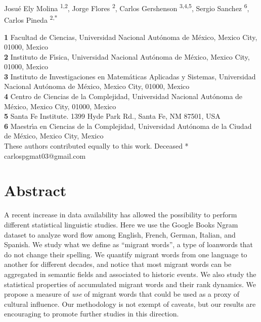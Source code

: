 \documentclass[10pt,letterpaper]{article} %
\begin{document}
\vspace*{0.2in}

\begin{flushleft}
{\Large
	\textbf{} %
}
\newline
Josué Ely Molina  \ddag\textsuperscript{1,2}, %
Jorge Flores      \dag \textsuperscript{2}, %
Carlos Gershenson \textsuperscript{3,4,5},
Sergio Sanchez    \textsuperscript{6},\\
Carlos Pineda     \ddag\textsuperscript{2,*}    %
% 


\bigskip
\newcommand{\unam}{Universidad Nacional Aut\'{o}noma de M\'{e}xico, Mexico City, 01000, Mexico}
\textbf{1} Facultad de Ciencias, \unam \\
\textbf{2} Instituto de F\'{\i}sica, \unam \\
\textbf{3} Instituto de Investigaciones en Matem\'{a}ticas Aplicadas y Sistemas, \unam \\
\textbf{4} Centro de Ciencias de la Complejidad, \unam \\
\textbf{5} Santa Fe Institute. 1399 Hyde Park Rd., Santa Fe, NM 87501, USA\\
\textbf{6} 
Maestr\'{\i}a en Ciencias de la Complejidad, 
Universidad Aut\'{o}noma de la Ciudad de M\'{e}xico,
Mexico City, Mexico
\\
\bigskip
\ddag These authors contributed equally to this work.
\dag Deceased
* carlospgmat03@gmail.com
\end{flushleft}
\section*{Abstract} %

A recent increase in data availability has allowed the possibility to perform different statistical linguistic studies. Here we use the Google Books Ngram dataset to analyze word flow among English, French, German, Italian, and Spanish. We study what we define as ``migrant words'', a type of loanwords that do not change their spelling. We quantify migrant words from one language to another for different decades, and notice that most migrant words can be aggregated in semantic fields and associated to historic events. We also study the statistical properties of accumulated migrant words and their rank dynamics. We propose a measure of \emph{use} of migrant words that could be used as a proxy of cultural influence. Our methodology is not exempt of caveats, but our results are encouraging to promote further studies in this direction.
\end{document}
